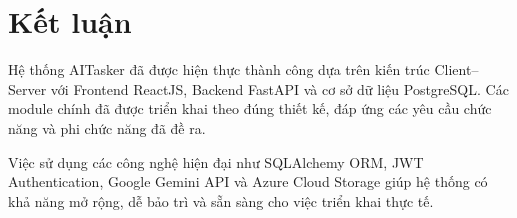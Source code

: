 
\section{Kết luận}

Hệ thống AITasker đã được hiện thực thành công dựa trên kiến trúc Client--Server
với Frontend ReactJS, Backend FastAPI và cơ sở dữ liệu PostgreSQL. Các module
chính đã được triển khai theo đúng thiết kế, đáp ứng các yêu cầu chức năng và
phi chức năng đã đề ra.

Việc sử dụng các công nghệ hiện đại như SQLAlchemy ORM, JWT Authentication,
Google Gemini API và Azure Cloud Storage giúp hệ thống có khả năng mở rộng,
dễ bảo trì và sẵn sàng cho việc triển khai thực tế.